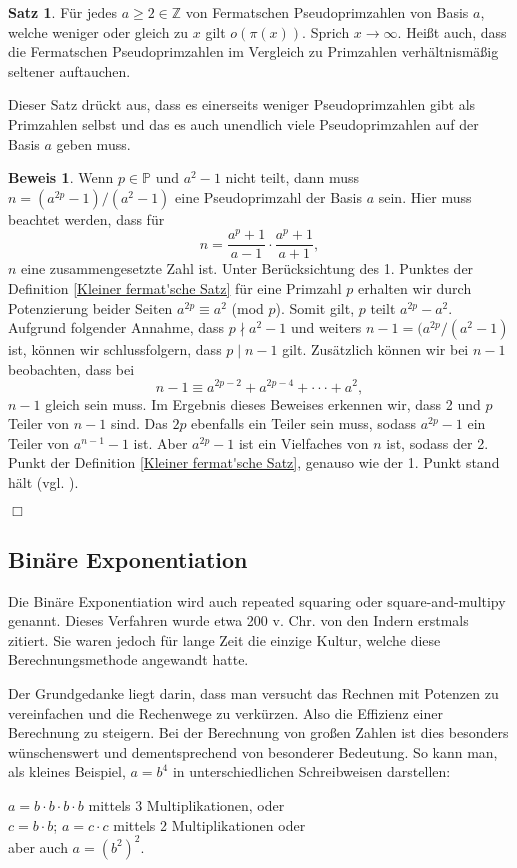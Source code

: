 \documentclass[12pt,a4paper]{article}
\theoremstyle{definition}
\newtheorem{satz}{Satz}[subsection]
\newtheorem{beweis}{Beweis}[subsection]
\begin{document}
\begin{satz}
Für jedes $a \geq 2 \in \mathbb{Z}$ von Fermatschen Pseudoprimzahlen von Basis $a$, welche weniger oder gleich zu $x$ gilt $o(\pi(x))$.
Sprich $x \rightarrow \infty$.
Heißt auch, dass die Fermatschen Pseudoprimzahlen im Vergleich zu Primzahlen verhältnismäßig seltener auftauchen.
\end{satz}
Dieser Satz drückt aus, dass es einerseits weniger Pseudoprimzahlen gibt als Primzahlen selbst und das es auch unendlich viele Pseudoprimzahlen auf der Basis $a$ geben muss.

\begin{beweis}
Wenn $p \in \mathbb{P}$ und $a^2-1$ nicht teilt, dann muss $n = (a^{2p}-1)/(a^2-1)$ eine Pseudoprimzahl der Basis $a$ sein.
Hier muss beachtet werden, dass für
\[n = \frac {a^p + 1} {a - 1} \cdot \frac {a^p + 1} {a + 1},\]
$n$ eine zusammengesetzte Zahl ist.
Unter Berücksichtung des 1. Punktes der Definition \ref{Kleiner fermat'sche Satz} für eine Primzahl $p$ erhalten wir durch Potenzierung beider Seiten $a^{2p} \equiv a^2$ (mod $p$).
Somit gilt, $p$ teilt $a^{2p} - a^2$.
Aufgrund folgender Annahme, dass $p \nmid a^2 - 1$ und weiters $n - 1 = (a^{2p} / (a^2 - 1)$ ist, können wir schlussfolgern, dass $p \mid n - 1$ gilt.
Zusätzlich können wir bei $n - 1$ beobachten, dass bei
\[n - 1 \equiv a^{2p-2} + a^{2p-4} + \cdot\cdot\cdot + a^2,\]
$n - 1$ gleich sein muss.
Im Ergebnis dieses Beweises erkennen wir, dass 2 und $p$ Teiler von $n - 1$ sind.
Das $2p$ ebenfalls ein Teiler sein muss, sodass $a^{2p} - 1$ ein Teiler von $a^{n-1} - 1$ ist.
Aber $a^{2p} - 1$ ist ein Vielfaches von $n$ ist, sodass der 2. Punkt der Definition \ref{Kleiner fermat'sche Satz}, genauso wie der 1. Punkt stand hält (vgl. \cite[131--133]{Crandall2005}).
\begin{flushright}
$\Box$
\end{flushright}
\end{beweis}


\subsection{Binäre Exponentiation}
Die Binäre Exponentiation wird auch repeated squaring oder square-and-multipy genannt.
Dieses Verfahren wurde etwa 200 v. Chr. von den Indern erstmals zitiert.
Sie waren jedoch für lange Zeit die einzige Kultur, welche diese Berechnungsmethode angewandt hatte.

Der Grundgedanke liegt darin, dass man versucht das Rechnen mit Potenzen zu vereinfachen und die Rechenwege zu verkürzen.
Also die Effizienz einer Berechnung zu steigern.
Bei der Berechnung von großen Zahlen ist dies besonders wünschenswert und dementsprechend von besonderer Bedeutung.
So kann man, als kleines Beispiel, $a = b^4$ in unterschiedlichen Schreibweisen darstellen:
\begin{center}
$a = b \cdot b \cdot b \cdot b$ mittels 3 Multiplikationen, oder \\
$c = b \cdot b$; $a = c \cdot c$ mittels 2 Multiplikationen oder \\
aber auch $a = (b^2)^2$.
\end{center}
\end{document}
